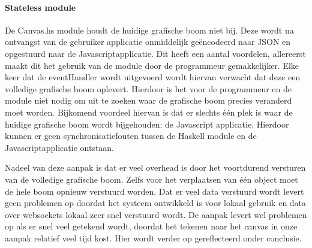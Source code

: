 \paragraph{Stateless module}
De Canvas.hs module houdt de huidige grafische boom niet bij. Deze wordt na ontvangst van de gebruiker applicatie onmiddelijk geëncodeerd naar JSON en opgestuurd naar de Javascriptapplicatie. Dit heeft een aantal voordelen, allereerst maakt dit het gebruik van de module door de programmeur gemakkelijker. Elke keer dat de eventHandler wordt uitgevoerd wordt hiervan verwacht dat deze een volledige grafische boom oplevert. Hierdoor is het voor de programmeur en de module niet nodig om uit te zoeken waar de grafische boom precies veranderd moet worden. Bijkomend voordeel hiervan is dat er slechts één plek is waar de huidige grafische boom wordt bijgehouden: de Javascript applicatie. Hierdoor kunnen er geen synchronisatiefouten tussen de Haskell module en de Javascriptapplicatie ontstaan. 

Nadeel van deze aanpak is dat er veel overhead is door het voortdurend versturen van de volledige grafische boom. Zelfs voor het verplaatsen van één object moet de hele boom opnieuw verstuurd worden. Dat er veel data verstuurd wordt levert geen problemen op doordat het systeem ontwikkeld is voor lokaal gebruik en data over websockets lokaal zeer snel verstuurd wordt. De aanpak levert wel problemen op als er snel veel getekend wordt, doordat het tekenen naar het canvas in onze aanpak relatief veel tijd kost. Hier wordt verder op gereflecteerd onder conclusie.